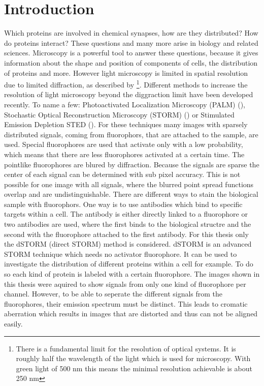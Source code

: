 \chapter{Introduction}
Which proteins are involved in chemical synapses, how are they distributed? How do proteins interact? These questions and many more arise in biology and related sciences. Microscopy is a powerful tool to answer these questions, because it gives information about the shape and position of components of cells, the distribution of proteins and more. However light microscopy is limited in spatial resolution due to limited diffraction, as described by \cite{Abbe} \footnote{There is a fundamental limit for the resolution of optical systems. It is roughly half the wavelength of the light which is used for microscopy. With green light of 500 nm this means the minimal resolution achievable is about 250 nm}. Different methods to increase the resolution of light microscopy beyond the diggraction limit have been developed recently. To name a few: Photoactivated Localization Microscopy (PALM) (\cite{Palm}), Stochastic Optical Reconstruction Microscopy (STORM) (\cite{Storm}) or Stimulated Emission Depletion STED (\cite{sted}).\newline
For these techniques many images with sparsely distributed signals, coming from fluorophors, that are attached to the sample, are used. Special fluorophores are used that activate only with a low probability, which means that there are less fluorophores activated at a certain time. The pointlike fluorophores are blured by diffraction. Because the signals are sparse the center of each signal can be determined with sub pixel accuracy. This is not possible for one image with all signals, where the blurred point spread functions overlap and are undistinguishable. There are different ways to stain the biological sample with fluorophors. One way is to use antibodies which bind to specific targets within a cell. The antibody is either directly linked to a fluorophore or two antibodies are used, where the first binds to the biological structre and the second with the fluorophore attached to the first antibody. 
\newline
For this thesis only the dSTORM (direct STORM) method is considered. dSTORM is an advanced STORM technique which needs no activator fluorophore. It can be used to investigate the distribution of different proteins within a cell for example. To do so each kind of protein is labeled with a certain fluorophore. The images shown in this thesis were aquired to show signals from only one kind of fluorophore per channel. However, to be able to seperate the different signals from the fluorophores, their emission spectrum must be distinct. This leads to cromatic aberration which results in images that are distorted and thus can not be aligned easily.\newline 
